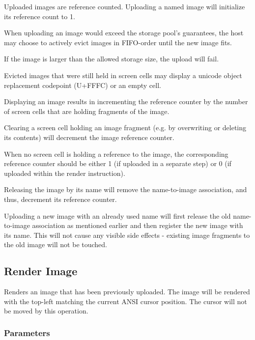 \documentclass[a4paper]{article}
\begin{document}
Uploaded images are reference counted. Uploading a named image will initialize its reference count to 1.

When uploading an image would exceed the storage pool's guarantees,
the host may choose to actively evict images in FIFO-order until the new image fits.

If the image is larger than the allowed storage size, the upload will fail.

Evicted images that were still held in screen cells may display a
unicode object replacement codepoint (U+FFFC) or an empty cell.

Displaying an image results in incrementing the reference counter
by the number of screen cells that are holding fragments of the image.

Clearing a screen cell holding an image fragment (e.g. by overwriting
or deleting its contents) will decrement the image reference counter.

When no screen cell is holding a reference to the image,
the corresponding reference counter should be either 1 (if uploaded in a separate step)
or 0 (if uploaded within the render instruction).

Releasing the image by its name will remove the name-to-image association, and thus,
decrement its reference counter.

Uploading a new image with an already used name will first release the old name-to-image association
as mentioned earlier and then register the new image with its name. This will not cause
any visible side effects - existing image fragments to the old image will not be touched.

\subsection{Render Image}

Renders an image that has been previously uploaded.
The image will be rendered with the top-left matching the current ANSI cursor position.
The cursor will not be moved by this operation.

\subsubsection*{Parameters}
\end{document}
